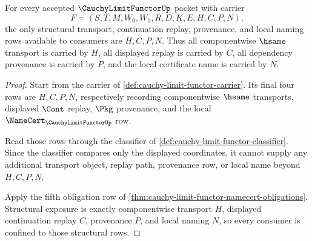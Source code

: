\begin{theorem}
\label{thm:cauchy-limit-functor-structural-transport}
For every accepted $\CauchyLimitFunctorUp$ packet with carrier
$$
F=(S,T,M,W_0,W_1,R,D,K,E,H,C,P,N),
$$
the only structural transport, continuation replay, provenance, and local naming rows available to consumers are $H,C,P,N$. Thus all componentwise $\hsame$ transport is carried by $H$, all displayed replay is carried by $C$, all dependency provenance is carried by $P$, and the local certificate name is carried by $N$.
\end{theorem}
\begin{proof}
Start from the carrier of \autoref{def:cauchy-limit-functor-carrier}. Its final four rows are $H,C,P,N$, respectively recording componentwise $\hsame$ transports, displayed $\Cont$ replay, $\Pkg$ provenance, and the local $\NameCert_{\CauchyLimitFunctorUp}$ row.

Read those rows through the classifier of \autoref{def:cauchy-limit-functor-classifier}. Since the classifier compares only the displayed coordinates, it cannot supply any additional transport object, replay path, provenance row, or local name beyond $H,C,P,N$.

Apply the fifth obligation row of \autoref{thm:cauchy-limit-functor-namecert-obligations}. Structural exposure is exactly componentwise transport $H$, displayed continuation replay $C$, provenance $P$, and local naming $N$, so every consumer is confined to those structural rows.
\end{proof}

